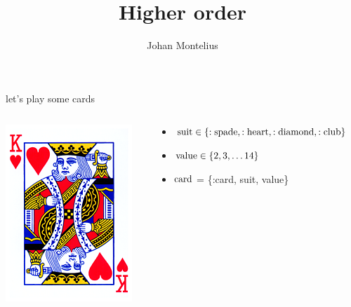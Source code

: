 

\title[ID1019 Higher order]{Higher order}


\author{Johan Montelius}
\date{\semester}



\begin{frame}
\titlepage
\end{frame}

\begin{frame}{let's play some cards}

\begin{columns}

 \begin{column}{0.2\linewidth}
   \includegraphics[width=\linewidth]{kung.png}
 \end{column}
 
 \pause

 \begin{column}{0.8\linewidth}
  \begin{itemize}
   \item ${\rm suit} \in \{{\rm :spade}, {\rm :heart}, {\rm :diamond}, {\rm :club}\}$
   \pause
   \item ${\rm value} \in \{2,3,\ldots 14\}$
   \pause 
   \item ${\rm card}$ = \{:card, suit, value\}
  \end{itemize}
 \end{column}
\end{columns}

\end{frame}

